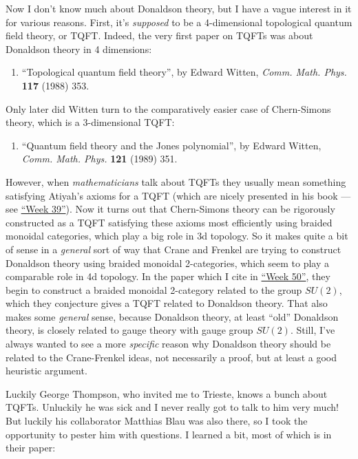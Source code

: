 \documentclass{article}
\def\tightlist{}
\begin{document}
Now I don't know much about Donaldson theory, but I have a vague
interest in it for various reasons. First, it's \emph{supposed} to be a
4-dimensional topological quantum field theory, or TQFT. Indeed, the
very first paper on TQFTs was about Donaldson theory in 4 dimensions:

\begin{enumerate}
\def\labelenumi{\arabic{enumi})}
\tightlist
\item
  ``Topological quantum field theory'', by Edward Witten, \emph{Comm.
  Math. Phys.} \textbf{117} (1988) 353.
\end{enumerate}

Only later did Witten turn to the comparatively easier case of
Chern-Simons theory, which is a 3-dimensional TQFT:

\begin{enumerate}
\def\labelenumi{\arabic{enumi})}
\setcounter{enumi}{1}
\tightlist
\item
  ``Quantum field theory and the Jones polynomial'', by Edward Witten,
  \emph{Comm. Math. Phys.} \textbf{121} (1989) 351.
\end{enumerate}

However, when \emph{mathematicians} talk about TQFTs they usually mean
something satisfying Atiyah's axioms for a TQFT (which are nicely
presented in his book --- see \protect\hyperlink{week39}{``Week 39''}).
Now it turns out that Chern-Simons theory can be rigorously constructed
as a TQFT satisfying these axioms most efficiently using braided
monoidal categories, which play a big role in 3d topology. So it makes
quite a bit of sense in a \emph{general} sort of way that Crane and
Frenkel are trying to construct Donaldson theory using braided monoidal
2-categories, which seem to play a comparable role in 4d topology. In
the paper which I cite in \protect\hyperlink{week50}{``Week 50''}, they
begin to construct a braided monoidal 2-category related to the group
\(SU(2)\), which they conjecture gives a TQFT related to Donaldson
theory. That also makes some \emph{general} sense, because Donaldson
theory, at least ``old'' Donaldson theory, is closely related to gauge
theory with gauge group \(SU(2)\). Still, I've always wanted to see a
more \emph{specific} reason why Donaldson theory should be related to
the Crane-Frenkel ideas, not necessarily a proof, but at least a good
heuristic argument.

Luckily George Thompson, who invited me to Trieste, knows a bunch about
TQFTs. Unluckily he was sick and I never really got to talk to him very
much! But luckily his collaborator Matthias Blau was also there, so I
took the opportunity to pester him with questions. I learned a bit, most
of which is in their paper:
\end{document}
